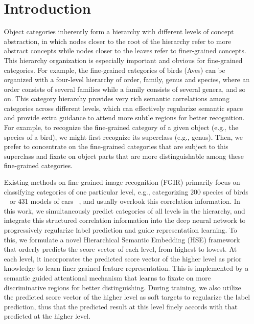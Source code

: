 \documentclass[sigconf]{acmart}
\begin{document}
\fi


\maketitle

\section{Introduction}
Object categories inherently form a hierarchy with different levels of concept abstraction, in which nodes closer to the root of the hierarchy refer to more abstract concepts while nodes closer to the leaves refer to finer-grained concepts. This hierarchy organization is especially important and obvious for fine-grained categories. For example, the fine-grained categories of birds (Aves) can be organized with a four-level hierarchy of order, family, genus and species, where an order consists of several families while a family consists of several genera, and so on. This category hierarchy provides very rich semantic correlations among categories across different levels, which can effectively regularize semantic space and provide extra guidance to attend more subtle regions for better recognition. For example, to recognize the fine-grained category of a given object (e.g., the species of a bird), we might first recognize its superclass (e.g., genus). Then, we prefer to concentrate on the fine-grained categories that are subject to this superclass and fixate on object parts that are more distinguishable among these fine-grained categories.


Existing methods on fine-grained image recognition (FGIR) primarily focus on classifying categories of one particular level, e.g., categorizing 200 species of birds ~\cite{lin2015bilinear,zheng2017learning} or 431 models of cars ~\cite{hu2017deep}, and usually overlook this correlation information. In this work, we simultaneously predict categories of all levels in the hierarchy, and integrate this structured correlation information into the deep neural network to progressively regularize label prediction and guide representation learning. To this, we formulate a novel Hierarchical Semantic Embedding (HSE) framework that orderly predicts the score vector of each level, from highest to lowest. At each level, it incorporates the predicted score vector of the higher level as prior knowledge to learn finer-grained feature representation. This is implemented by a semantic guided attentional mechanism that learns to fixate on more discriminative regions for better distinguishing. During training, we also utilize the predicted score vector of the higher level as soft targets to regularize the label prediction, thus that the predicted result at this level finely accords with that predicted at the higher level. 
\end{document}

